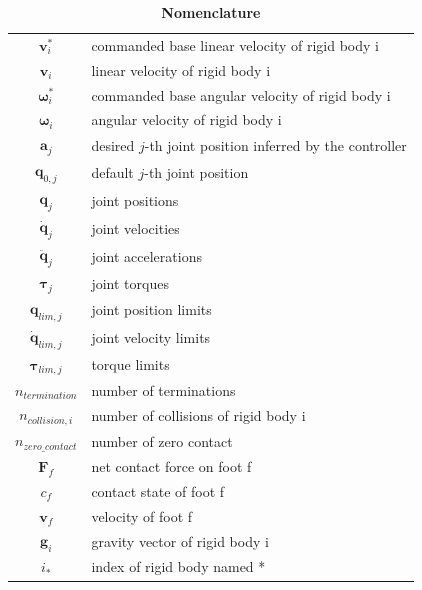\documentclass[9pt,twocolumn,twoside]{osajnl}
\begin{document}
\begin{table}[h]
\centering
\caption{\textbf{Nomenclature}}
\label{tab:symbol}
\begin{tabular}{cl}
\hline

$\mathbf{v}_{i}^{*}$ & commanded base linear velocity of rigid body i         \\
$\mathbf{v}_{i}$     &  linear velocity of rigid body i\\
$\boldsymbol{\omega}_{i}^*$ &  commanded base angular velocity of rigid body i        \\
$\boldsymbol{\omega}_{i}$ &  angular velocity of rigid body i         \\
$\mathbf{a}_j$         &  desired $j$-th joint position inferred by the controller  \\
$\mathbf{q}_{0, j}$ &   default $j$-th joint position       \\
$\mathbf{q}_j$ &   joint positions      \\
$\mathbf{\dot{q}}_j$ &   joint velocities       \\
$\mathbf{\ddot{q}}_j$ &   joint accelerations   \\
$\boldsymbol{\tau}_j$ &   joint torques        \\
$\mathbf{q}_{lim, j}$ &  joint position limits \\
$\mathbf{\dot{q}}_{lim, j}$ &  joint velocity limits \\
$\boldsymbol{\tau}_{lim, j}$ &  torque limits \\
$n_{termination}$   &   number of terminations        \\
$n_{collision, i}$      &   number of collisions of rigid body i          \\
$n_{zero\_contact}$   &   number of zero contact        \\
$\mathbf{F}_f$                &  net contact force on foot f\\ 
$c_f$                &    contact state of foot f  \\
$\mathbf{v}_f$                &    velocity of foot f  \\ 
$\mathbf{g}_{i}$ & gravity vector of rigid body i         \\
$i_{*}$                &    index of rigid body named * \\\hline
\end{tabular}
\end{table}
\end{document}

